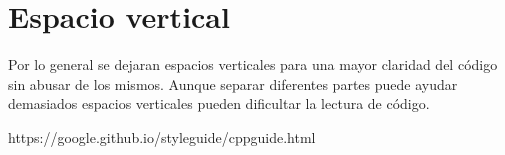 
\section{Espacio vertical}

Por lo general se dejaran espacios verticales para una mayor claridad del código sin abusar de los mismos. Aunque separar diferentes partes puede ayudar demasiados espacios verticales pueden dificultar la lectura de código.



https://google.github.io/styleguide/cppguide.html